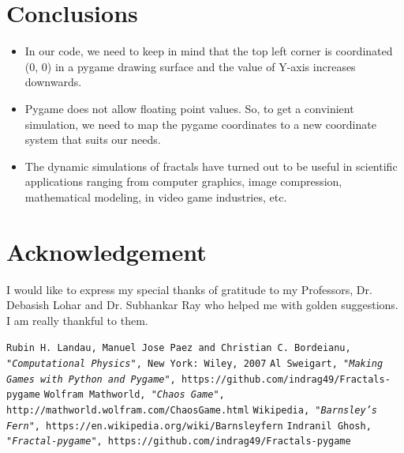 \documentclass{article}
\begin{document}
\section{Conclusions}
\begin{itemize}
\item In our code, we need to keep in mind that the top left corner is coordinated (0, 0) in a pygame drawing surface and the value of Y-axis increases downwards.
\item Pygame does not allow floating point values. So, to get a convinient simulation, we need to map the pygame coordinates to a new coordinate system that suits our needs.
\item The dynamic simulations of fractals have turned out to be useful in scientific applications ranging from computer graphics, image compression, mathematical modeling, in video game industries, etc.
\end{itemize}
\section{Acknowledgement}
I would like to express my special thanks of gratitude to my Professors, Dr. Debasish Lohar and Dr. Subhankar Ray who helped me with golden suggestions. I am really thankful to them.

\begin{thebibliography}{10}
\texttt{Rubin H. Landau, Manuel Jose Paez and Christian C. Bordeianu, \textit{"Computational Physics"}, New York: Wiley, 2007}
\texttt{Al Sweigart, \textit{"Making Games with Python and Pygame"}, https://github.com/indrag49/Fractals-pygame}
\texttt{Wolfram Mathworld, \textit{"Chaos Game"}, http://mathworld.wolfram.com/ChaosGame.html}
\texttt{Wikipedia, \textit{"Barnsley's Fern"}, https://en.wikipedia.org/wiki/Barnsleyfern}
\texttt{Indranil Ghosh, \textit{"Fractal-pygame"}, https://github.com/indrag49/Fractals-pygame}
\end{thebibliography}
\end{document}

